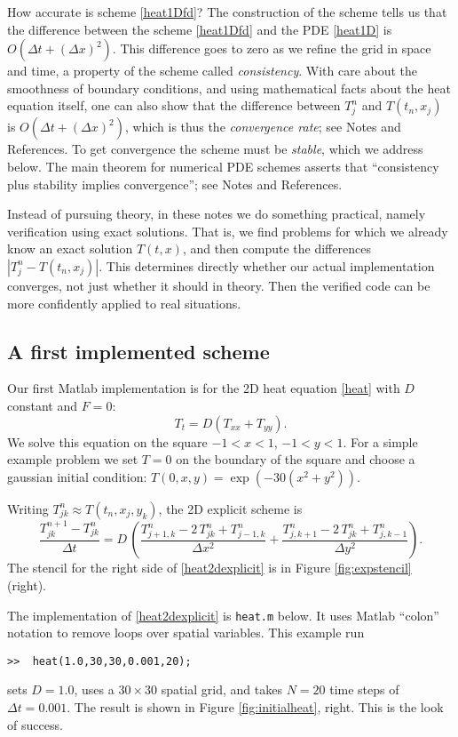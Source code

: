 \documentclass[letterpaper,final,12pt,reqno]{amsart}
\begin{document}
How accurate is scheme \eqref{heat1Dfd}?  The construction of the scheme tells us that the difference between the scheme \eqref{heat1Dfd} and the PDE \eqref{heat1D} is $O(\Delta t + (\Delta x)^2)$.  This difference goes to zero as we refine the grid in space and time, a property of the scheme called \emph{consistency}.  With care about the smoothness of boundary conditions, and using mathematical facts about the heat equation itself, one can also show that the difference between $T_j^n$ and $T(t_n,x_j)$ is $O(\Delta t + (\Delta x)^2)$, which is thus the \emph{convergence rate}; see Notes and References.  To get convergence the scheme must be \emph{stable}, which we address below.  The main theorem for numerical PDE schemes asserts that ``consistency plus stability implies convergence''; see Notes and References.

Instead of pursuing theory, in these notes we do something practical, namely verification using exact solutions.  That is, we find problems for which we already know an exact solution $T(t,x)$, and then compute the differences $|T_j^n - T(t_n,x_j)|$.  This determines directly whether our actual implementation converges, not just whether it should in theory.  Then the verified code can be more confidently applied to real situations.

\subsection*{A first implemented scheme}  Our first Matlab implementation is for the 2D heat equation \eqref{heat} with $D$ constant and $F=0$:
\begin{equation}
T_t = D (T_{xx}+T_{yy}).\label{heat2D}
\end{equation}
We solve this equation on the square $-1 < x < 1$, $-1 < y < 1$.  For a simple example problem we set $T=0$ on the boundary of the square and choose a gaussian initial condition: $T(0,x,y) = \exp(-30 (x^2+y^2))$.

Writing $T_{jk}^n \approx T(t_n,x_j,y_k)$, the 2D explicit scheme is
\begin{equation}
	\frac{T_{jk}^{n+1} - T_{jk}^n}{\Delta t} = D\,\left(\frac{T_{j+1,k}^n - 2\, T_{jk}^n + T_{j-1,k}^n}{\Delta x^2} + \frac{T_{j,k+1}^n - 2\, T_{jk}^n + T_{j,k-1}^n}{\Delta y^2}\right). \label{heat2dexplicit}
\end{equation}
The stencil for the right side of \eqref{heat2dexplicit} is in Figure \ref{fig:expstencil} (right).

The implementation of \eqref{heat2dexplicit} is \texttt{heat.m} below.  It uses Matlab ``colon'' notation to remove loops over spatial variables.  This example run
\begin{Verbatim}
>>  heat(1.0,30,30,0.001,20);
\end{Verbatim}
sets $D=1.0$, uses a $30\times 30$ spatial grid, and takes $N=20$ time steps of $\Delta t = 0.001$.  The result is shown in Figure \ref{fig:initialheat}, right.  This is the look of success.
\end{document}
